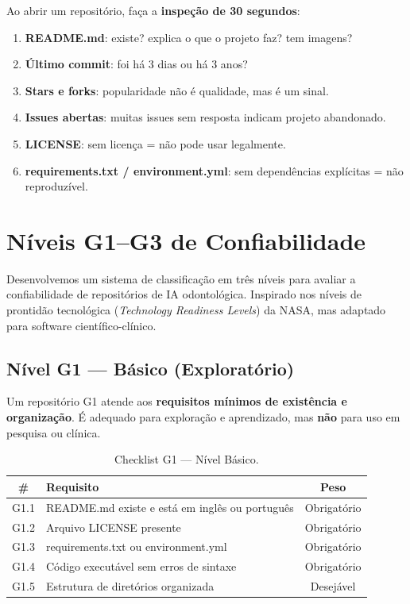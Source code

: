 Ao abrir um repositório, faça a \textbf{inspeção de 30 segundos}:

\begin{enumerate}
  \item \textbf{README.md}: existe? explica o que o projeto faz? tem imagens?
  \item \textbf{Último commit}: foi há 3 dias ou há 3 anos?
  \item \textbf{Stars e forks}: popularidade não é qualidade, mas é um sinal.
  \item \textbf{Issues abertas}: muitas issues sem resposta indicam projeto abandonado.
  \item \textbf{LICENSE}: sem licença = não pode usar legalmente.
  \item \textbf{requirements.txt / environment.yml}: sem dependências explícitas = não reproduzível.
\end{enumerate}

\section{Níveis G1--G3 de Confiabilidade}

Desenvolvemos um sistema de classificação em três níveis para avaliar a
confiabilidade de repositórios de IA odontológica. Inspirado nos níveis
de prontidão tecnológica (\textit{Technology Readiness Levels}) da NASA,
mas adaptado para software científico-clínico.

 

\subsection{Nível G1 — Básico (Exploratório)}

Um repositório G1 atende aos \textbf{requisitos mínimos de existência e
organização}. É adequado para exploração e aprendizado, mas \textbf{não}
para uso em pesquisa ou clínica.

\begin{table}[H]
  \centering
  \caption{Checklist G1 — Nível Básico.}
  \label{tab:g1-checklist}
  \begin{tabularx}{\textwidth}{cXc}
    \toprule
    \textbf{\#} & \textbf{Requisito} & \textbf{Peso} \\
    \midrule
    G1.1 & README.md existe e está em inglês ou português & Obrigatório \\
    G1.2 & Arquivo LICENSE presente & Obrigatório \\
    G1.3 & requirements.txt ou environment.yml & Obrigatório \\
    G1.4 & Código executável sem erros de sintaxe & Obrigatório \\
    G1.5 & Estrutura de diretórios organizada & Desejável \\
    \bottomrule
  \end{tabularx}
\end{table}

